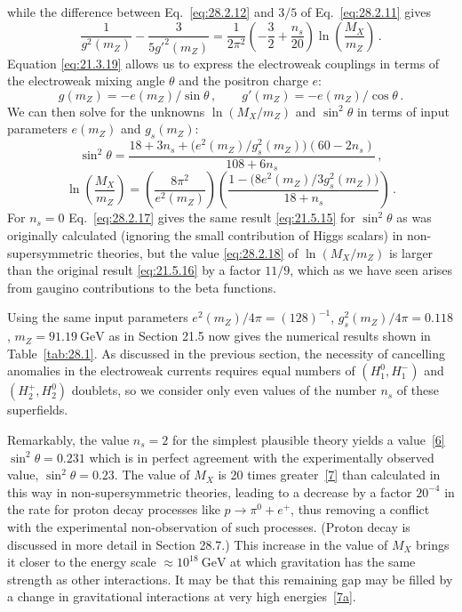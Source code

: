 while the difference between Eq.~\eqref{eq:28.2.12} and \(3/5\) of
Eq.~\eqref{eq:28.2.11} gives
\begin{equation}
  \frac{1}{g^2(m_Z)}-\frac{3}{5g'^2(m_Z)}
  =\frac{1}{2\pi^2}
  \left(-\frac{3}{2}+\frac{n_s}{20}\right)
  \ln\left(\frac{M_X}{m_Z}\right)\,.
  \tag{28.2.15}\label{eq:28.2.15}
\end{equation}
Equation \eqref{eq:21.3.19} allows us to express the electroweak couplings in
terms of the electroweak mixing angle \(\theta\) and the positron charge
\(e\):
\begin{equation}
  g(m_Z)=-e(m_Z)/\sin\theta\,,
  \qquad
  g'(m_Z)=-e(m_Z)/\cos\theta\,.
  \tag{28.2.16}\label{eq:28.2.16}
\end{equation}
We can then solve for the unknowns \(\ln(M_X/m_Z)\) and \(\sin^2\theta\) in
terms of input parameters \(e(m_Z)\) and \(g_s(m_Z)\):
\begin{equation}
  \sin^2\theta
  =
  \frac{
    18+3n_s+\bigl(e^2(m_Z)/g_s^2(m_Z)\bigr)(60-2n_s)
  }{108+6n_s}\,,
  \tag{28.2.17}\label{eq:28.2.17}
\end{equation}
\begin{equation}
  \ln\left(\frac{M_X}{m_Z}\right)
  =
  \left(\frac{8\pi^2}{e^2(m_Z)}\right)
  \left(
    \frac{1-\bigl(8e^2(m_Z)/3g_s^2(m_Z)\bigr)}{18+n_s}
  \right)\,.
  \tag{28.2.18}\label{eq:28.2.18}
\end{equation}
For \(n_s=0\) Eq.~\eqref{eq:28.2.17} gives the same result
\eqref{eq:21.5.15} for \(\sin^2\theta\) as was originally calculated
(ignoring the small contribution of Higgs scalars) in non-supersymmetric
theories, but the value \eqref{eq:28.2.18} of \(\ln(M_X/m_Z)\) is larger
than the original result \eqref{eq:21.5.16} by a factor \(11/9\), which as
we have seen arises from gaugino contributions to the beta functions.

Using the same input parameters \(e^2(m_Z)/4\pi=(128)^{-1}\),
\(g_s^2(m_Z)/4\pi=0.118\), \(m_Z=91.19\ \mathrm{GeV}\) as in Section 21.5
now gives the numerical results shown in Table~\ref{tab:28.1}. As discussed
in the previous section, the necessity of cancelling anomalies in the
electroweak currents requires equal numbers of \((H_1^0,H_1^-)\) and
\((H_2^+,H_2^0)\) doublets, so we consider only even values of the number
\(n_s\) of these superfields.

Remarkably, the value \(n_s=2\) for the simplest plausible theory yields a
value~\hyperref[ch28-ref-6]{[6]} \(\sin^2\theta=0.231\) which is in perfect
agreement with the experimentally observed value, \(\sin^2\theta=0.23\).
The value of \(M_X\) is 20 times
greater~\hyperref[ch28-ref-7]{[7]} than calculated in this way in
non-supersymmetric theories, leading to a decrease by a factor \(20^{-4}\)
in the rate for proton decay processes like
\(p\longrightarrow\pi^0+e^+\), thus removing a conflict with the
experimental non-observation of such processes. (Proton decay is discussed
in more detail in Section 28.7.) This increase in the value of \(M_X\)
brings it closer to the energy scale \(\approx10^{18}\ \mathrm{GeV}\) at
which gravitation has the same strength as other interactions. It may be
that this remaining gap may be filled by a change in gravitational
interactions at very high energies~\hyperref[ch28-ref-7a]{[7a]}.

